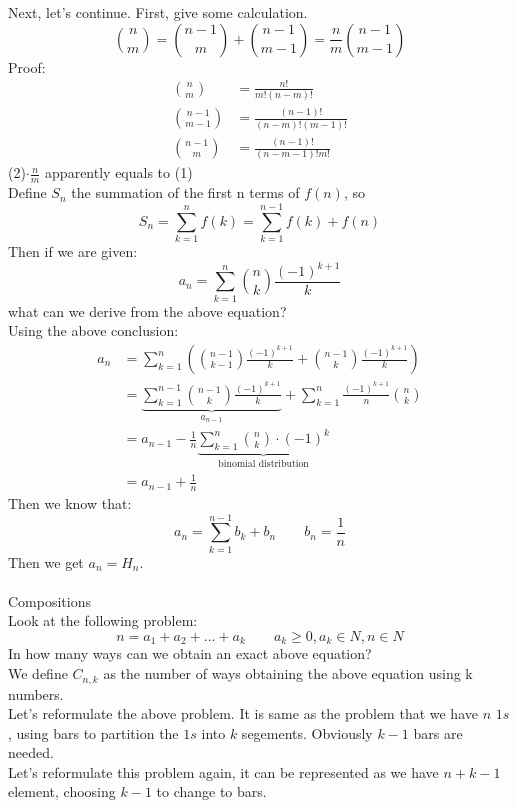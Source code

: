 \documentclass{article}
\begin{document}
Next, let's continue. First, give some calculation. \\
\[
\binom{n}{m}=\binom{n-1}{m}+\binom{n-1}{m-1}=\frac{n}{m}\binom{n-1}{m-1}
\]
Proof:\\
\begin{align}
\binom{n}{m}&=\frac{n!}{m!(n-m)!} \\
\binom{n-1}{m-1}&=\frac{(n-1)!}{(n-m)!(m-1)!} \\
\binom{n-1}{m}&=\frac{(n-1)!}{(n-m-1)!m!}
\end{align}
(2)$\cdot \frac{n}{m}$ apparently equals to (1)\\
Define $S_n$ the summation of the first n terms of $f(n)$, so \\
\[
S_n=\sum_{k=1}^nf(k)=\sum_{k=1}^{n-1}f(k)+f(n)
\]
Then if we are given:\\
\[
a_n=\sum_{k=1}^n\binom{n}{k}\frac{(-1)^{k+1}}{k}
\]
what can we derive from the above equation?\\
Using the above conclusion:\\
\begin{align*}
a_n&=\sum_{k=1}^n\left(\binom{n-1}{k-1}\frac{(-1)^{k+1}}{k}+\binom{n-1}{k}\frac{(-1)^{k+1}}{k}\right)
  \\
&=\underbrace{\sum_{k=1}^{n-1}\binom{n-1}{k}\frac{(-1)^{k+1}}{k}}_{a_{n-1}}+\sum_{k=1}^n\frac{(-1)^{k+1}}{n}\binom{n}{k}\\
&=a_{n-1}-\frac{1}{n}\underbrace{\sum_{k=1}^n\binom{n}{k}\cdot(-1)^k}_{\text{binomial
  distribution}} \\
&=a_{n-1}+\frac{1}{n}
\end{align*}
Then we know that:\\
\[
a_n = \sum_{k=1}^{n-1}b_k+b_n\qquad b_n = \frac{1}{n}
\]
Then we get $a_n=H_n$.\\
 \\
Compositions\\
Look at the following problem:\\
\[
n=a_1+a_2+...+a_k\qquad a_k\geq 0,a_k\in N,n\in N
\]
In how many ways can we obtain an exact above equation?\\
We define $C_{n,k}$ as the number of ways obtaining the above equation
using k numbers.\\
Let's reformulate the above problem. It is same as the problem that we
have $n$ $1s$, using bars to partition the $1s$ into $k$
segements. Obviously $k-1$ bars are needed. \\
Let's reformulate this problem again, it can be represented as we have
$n+k-1$ element, choosing  $k-1$ to change to bars.\\
\end{document}
